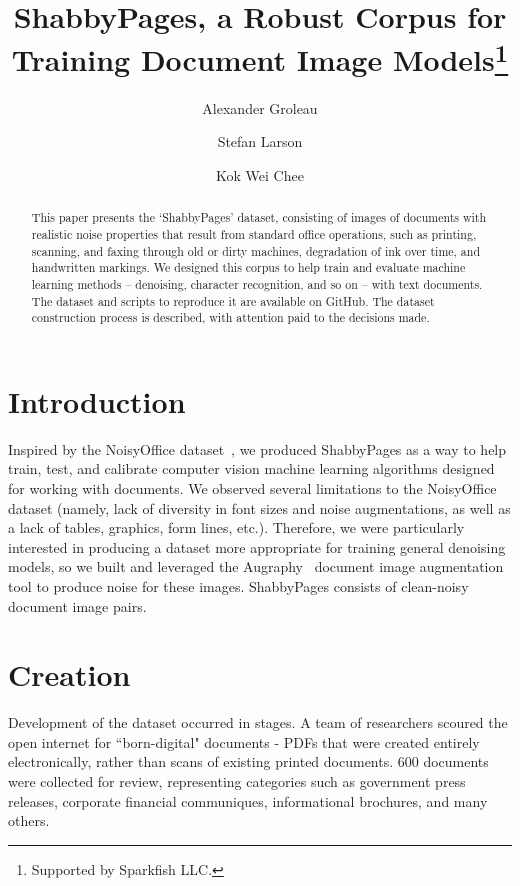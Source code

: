 \documentclass[runningheads]{llncs}
\begin{document}
\title{ShabbyPages, a Robust Corpus for Training Document Image Models\thanks{Supported by Sparkfish LLC.}}

\author{Alexander Groleau \and
  Stefan Larson \and
  Kok Wei Chee}

\maketitle

\begin{abstract}
This paper presents the ‘ShabbyPages’ dataset, consisting of images of documents with realistic noise properties that result from standard office operations, such as printing, scanning, and faxing through old or dirty machines, degradation of ink over time, and handwritten markings. We designed this corpus to help train and evaluate machine learning methods -- denoising, character recognition, and so on -- with text documents. The dataset and scripts to reproduce it are available on GitHub. The dataset construction process is described, with attention paid to the decisions made.

\end{abstract}

\section{Introduction}
Inspired by the NoisyOffice dataset~\cite{ref_url1}, we produced ShabbyPages as a way to help train, test, and calibrate computer vision machine learning algorithms designed for working with documents. We observed several limitations to the NoisyOffice dataset (namely, lack of diversity in font sizes and noise augmentations, as well as a lack of tables, graphics, form lines, etc.). Therefore, we were particularly interested in producing a dataset more appropriate for training general denoising models, so we built and leveraged the Augraphy~\cite{ref_url2} document image augmentation tool to produce noise for these images. ShabbyPages consists of  clean-noisy document image pairs.

\section{Creation}
Development of the dataset occurred in stages. A team of researchers scoured the open internet for ``born-digital" documents - PDFs that were created entirely electronically, rather than scans of existing printed documents. 600 documents were collected for review, representing categories such as government press releases, corporate financial communiques, informational brochures, and many others.\\
\end{document}
